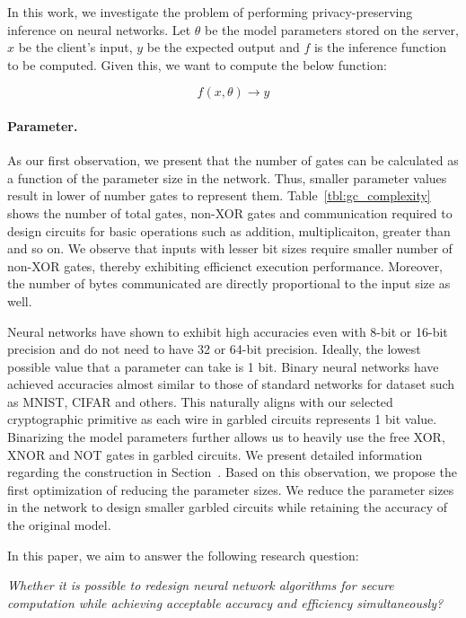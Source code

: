 In this work, we investigate the problem of performing privacy-preserving inference on neural networks. Let $\theta$ be the model parameters stored on the server, $x$ be the client's input, $y$ be the expected output and $f$ is the inference function to be computed. Given this, we want to compute the below function:

\begin{equation}
f(x,\theta)\rightarrow y
\end{equation}


\paragraph{Parameter.}
As our first observation, we present that the number of gates can be calculated as a function of the parameter size in the network. Thus, smaller parameter values result in lower of number gates to represent them. Table~\ref{tbl:gc_complexity} shows the number of total gates, non-XOR gates and communication required to design circuits for basic operations such as addition, multiplicaiton, greater than and so on. We observe that inputs with lesser bit sizes require smaller number of non-XOR gates, thereby exhibiting efficienct execution performance. Moreover, the number of bytes communicated are directly proportional to the
input size as well.

Neural networks have shown to exhibit high accuracies even with 8-bit or 16-bit precision and do not need to have 32 or 64-bit precision. Ideally, the lowest possible value that a parameter can take is 1 bit. Binary neural networks have achieved accuracies almost similar to those of standard networks for dataset such as MNIST, CIFAR and others.  This naturally aligns with our selected cryptographic primitive as each wire in garbled circuits represents 1 bit value.  Binarizing the model parameters further allows us to heavily use the free XOR, XNOR and NOT gates in garbled circuits. We present detailed information regarding the construction in Section~\cite{}.
Based on this observation, we propose the first optimization of reducing the parameter sizes. We reduce the parameter sizes in the network to design smaller garbled circuits while retaining the accuracy of the original model.

In this paper, we aim to answer the following research question:

{\em Whether it is possible to redesign neural network algorithms for secure computation while achieving acceptable accuracy and efficiency simultaneously?}


